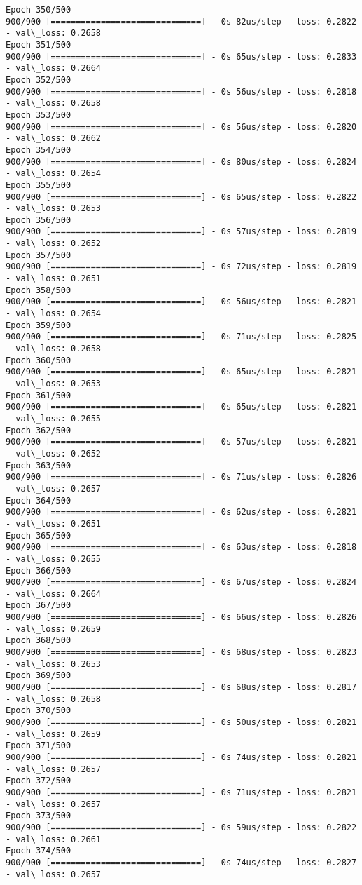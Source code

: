 \documentclass[11pt]{article}
\begin{document}
\begin{Verbatim}[commandchars=\\\{\}]
Epoch 350/500
900/900 [==============================] - 0s 82us/step - loss: 0.2822 - val\_loss: 0.2658
Epoch 351/500
900/900 [==============================] - 0s 65us/step - loss: 0.2833 - val\_loss: 0.2664
Epoch 352/500
900/900 [==============================] - 0s 56us/step - loss: 0.2818 - val\_loss: 0.2658
Epoch 353/500
900/900 [==============================] - 0s 56us/step - loss: 0.2820 - val\_loss: 0.2662
Epoch 354/500
900/900 [==============================] - 0s 80us/step - loss: 0.2824 - val\_loss: 0.2654
Epoch 355/500
900/900 [==============================] - 0s 65us/step - loss: 0.2822 - val\_loss: 0.2653
Epoch 356/500
900/900 [==============================] - 0s 57us/step - loss: 0.2819 - val\_loss: 0.2652
Epoch 357/500
900/900 [==============================] - 0s 72us/step - loss: 0.2819 - val\_loss: 0.2651
Epoch 358/500
900/900 [==============================] - 0s 56us/step - loss: 0.2821 - val\_loss: 0.2654
Epoch 359/500
900/900 [==============================] - 0s 71us/step - loss: 0.2825 - val\_loss: 0.2658
Epoch 360/500
900/900 [==============================] - 0s 65us/step - loss: 0.2821 - val\_loss: 0.2653
Epoch 361/500
900/900 [==============================] - 0s 65us/step - loss: 0.2821 - val\_loss: 0.2655
Epoch 362/500
900/900 [==============================] - 0s 57us/step - loss: 0.2821 - val\_loss: 0.2652
Epoch 363/500
900/900 [==============================] - 0s 71us/step - loss: 0.2826 - val\_loss: 0.2657
Epoch 364/500
900/900 [==============================] - 0s 62us/step - loss: 0.2821 - val\_loss: 0.2651
Epoch 365/500
900/900 [==============================] - 0s 63us/step - loss: 0.2818 - val\_loss: 0.2655
Epoch 366/500
900/900 [==============================] - 0s 67us/step - loss: 0.2824 - val\_loss: 0.2664
Epoch 367/500
900/900 [==============================] - 0s 66us/step - loss: 0.2826 - val\_loss: 0.2659
Epoch 368/500
900/900 [==============================] - 0s 68us/step - loss: 0.2823 - val\_loss: 0.2653
Epoch 369/500
900/900 [==============================] - 0s 68us/step - loss: 0.2817 - val\_loss: 0.2658
Epoch 370/500
900/900 [==============================] - 0s 50us/step - loss: 0.2821 - val\_loss: 0.2659
Epoch 371/500
900/900 [==============================] - 0s 74us/step - loss: 0.2821 - val\_loss: 0.2657
Epoch 372/500
900/900 [==============================] - 0s 71us/step - loss: 0.2821 - val\_loss: 0.2657
Epoch 373/500
900/900 [==============================] - 0s 59us/step - loss: 0.2822 - val\_loss: 0.2661
Epoch 374/500
900/900 [==============================] - 0s 74us/step - loss: 0.2827 - val\_loss: 0.2657

\end{Verbatim}
\end{document}
